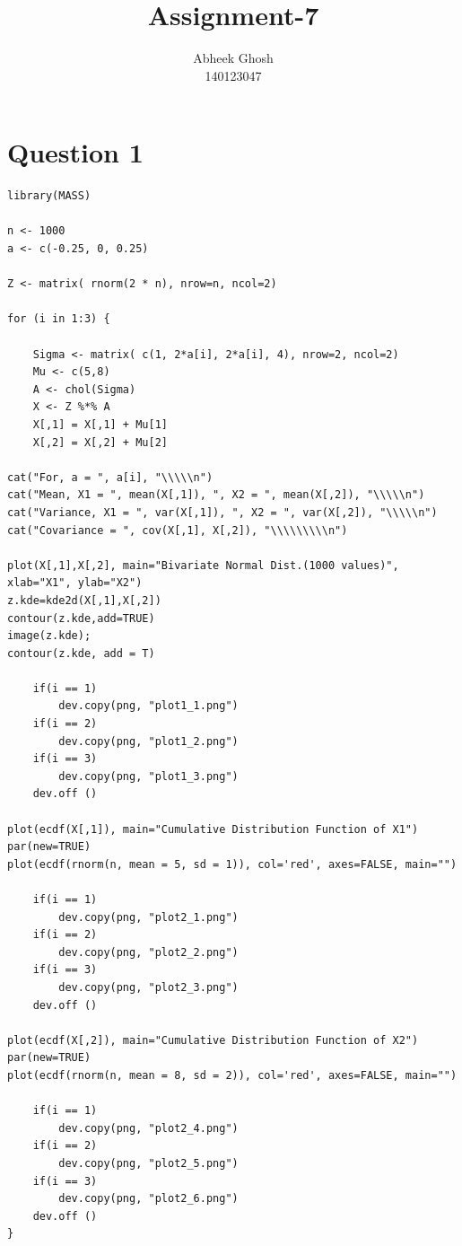 \documentclass{article}
\begin{document}
	\title{\textbf{Assignment-7}}
	\author{Abheek Ghosh \\ 
		140123047 }
	
	\maketitle
	

\section{Question 1}


\begin{lstlisting}
library(MASS)

n <- 1000
a <- c(-0.25, 0, 0.25)

Z <- matrix( rnorm(2 * n), nrow=n, ncol=2)

for (i in 1:3) {

	Sigma <- matrix( c(1, 2*a[i], 2*a[i], 4), nrow=2, ncol=2)
	Mu <- c(5,8)
	A <- chol(Sigma)
	X <- Z %*% A
	X[,1] = X[,1] + Mu[1]
	X[,2] = X[,2] + Mu[2]

cat("For, a = ", a[i], "\\\\\n")
cat("Mean, X1 = ", mean(X[,1]), ", X2 = ", mean(X[,2]), "\\\\\n")
cat("Variance, X1 = ", var(X[,1]), ", X2 = ", var(X[,2]), "\\\\\n")
cat("Covariance = ", cov(X[,1], X[,2]), "\\\\\\\\\n")

plot(X[,1],X[,2], main="Bivariate Normal Dist.(1000 values)", xlab="X1", ylab="X2")
z.kde=kde2d(X[,1],X[,2])
contour(z.kde,add=TRUE) 
image(z.kde); 
contour(z.kde, add = T)

	if(i == 1)
		dev.copy(png, "plot1_1.png")
	if(i == 2)
		dev.copy(png, "plot1_2.png")
	if(i == 3)
		dev.copy(png, "plot1_3.png")
	dev.off ()

plot(ecdf(X[,1]), main="Cumulative Distribution Function of X1")
par(new=TRUE)
plot(ecdf(rnorm(n, mean = 5, sd = 1)), col='red', axes=FALSE, main="")
	
	if(i == 1)
		dev.copy(png, "plot2_1.png")
	if(i == 2)
		dev.copy(png, "plot2_2.png")
	if(i == 3)
		dev.copy(png, "plot2_3.png")
	dev.off ()

plot(ecdf(X[,2]), main="Cumulative Distribution Function of X2")
par(new=TRUE)
plot(ecdf(rnorm(n, mean = 8, sd = 2)), col='red', axes=FALSE, main="")
	
	if(i == 1)
		dev.copy(png, "plot2_4.png")
	if(i == 2)
		dev.copy(png, "plot2_5.png")
	if(i == 3)
		dev.copy(png, "plot2_6.png")
	dev.off ()
}
\end{lstlisting}
\end{document}
